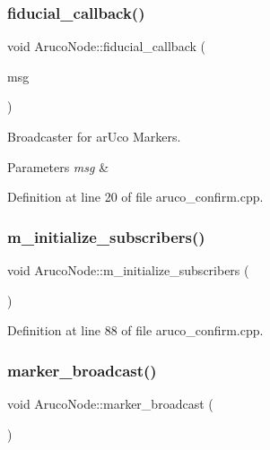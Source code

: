 \subsubsection{\texorpdfstring{fiducial\+\_\+callback()}{fiducial\_callback()}}
{\footnotesize\ttfamily void Aruco\+Node\+::fiducial\+\_\+callback (\begin{DoxyParamCaption}\item[{const fiducial\+\_\+msgs\+::\+Fiducial\+Transform\+Array\+::\+Const\+Ptr \&}]{msg }\end{DoxyParamCaption})}



Broadcaster for ar\+Uco Markers. 


\begin{DoxyParams}{Parameters}
{\em msg} & \\
\hline
\end{DoxyParams}


Definition at line 20 of file aruco\+\_\+confirm.\+cpp.

\mbox{\label{class_aruco_node_a3aa9013d9f53f08c7de83be3359f7503}} 
\subsubsection{\texorpdfstring{m\+\_\+initialize\+\_\+subscribers()}{m\_initialize\_subscribers()}}
{\footnotesize\ttfamily void Aruco\+Node\+::m\+\_\+initialize\+\_\+subscribers (\begin{DoxyParamCaption}{ }\end{DoxyParamCaption})}



Definition at line 88 of file aruco\+\_\+confirm.\+cpp.

\mbox{\label{class_aruco_node_adb4d7fb3af40cb83ae69be077c589558}} 
\subsubsection{\texorpdfstring{marker\+\_\+broadcast()}{marker\_broadcast()}}
{\footnotesize\ttfamily void Aruco\+Node\+::marker\+\_\+broadcast (\begin{DoxyParamCaption}{ }\end{DoxyParamCaption})}




